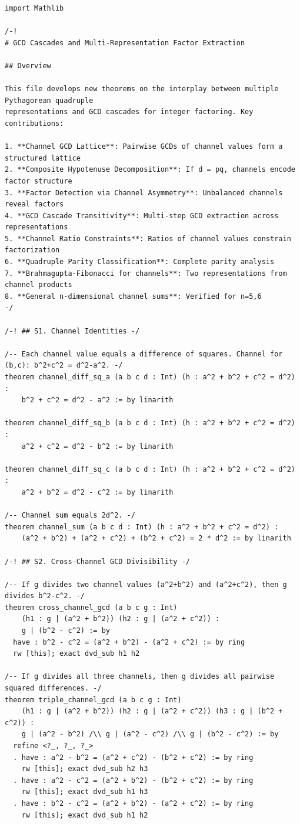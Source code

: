 \documentclass[11pt,openright,twoside]{book}
\theoremstyle{definition}
\begin{document}
\begin{lstlisting}[style=lean]
import Mathlib

/-!
# GCD Cascades and Multi-Representation Factor Extraction

## Overview

This file develops new theorems on the interplay between multiple Pythagorean quadruple
representations and GCD cascades for integer factoring. Key contributions:

1. **Channel GCD Lattice**: Pairwise GCDs of channel values form a structured lattice
2. **Composite Hypotenuse Decomposition**: If d = pq, channels encode factor structure
3. **Factor Detection via Channel Asymmetry**: Unbalanced channels reveal factors
4. **GCD Cascade Transitivity**: Multi-step GCD extraction across representations
5. **Channel Ratio Constraints**: Ratios of channel values constrain factorization
6. **Quadruple Parity Classification**: Complete parity analysis
7. **Brahmagupta-Fibonacci for channels**: Two representations from channel products
8. **General n-dimensional channel sums**: Verified for n=5,6
-/

/-! ## S1. Channel Identities -/

/-- Each channel value equals a difference of squares. Channel for (b,c): b^2+c^2 = d^2-a^2. -/
theorem channel_diff_sq_a (a b c d : Int) (h : a^2 + b^2 + c^2 = d^2) :
    b^2 + c^2 = d^2 - a^2 := by linarith

theorem channel_diff_sq_b (a b c d : Int) (h : a^2 + b^2 + c^2 = d^2) :
    a^2 + c^2 = d^2 - b^2 := by linarith

theorem channel_diff_sq_c (a b c d : Int) (h : a^2 + b^2 + c^2 = d^2) :
    a^2 + b^2 = d^2 - c^2 := by linarith

/-- Channel sum equals 2d^2. -/
theorem channel_sum (a b c d : Int) (h : a^2 + b^2 + c^2 = d^2) :
    (a^2 + b^2) + (a^2 + c^2) + (b^2 + c^2) = 2 * d^2 := by linarith

/-! ## S2. Cross-Channel GCD Divisibility -/

/-- If g divides two channel values (a^2+b^2) and (a^2+c^2), then g divides b^2-c^2. -/
theorem cross_channel_gcd (a b c g : Int)
    (h1 : g | (a^2 + b^2)) (h2 : g | (a^2 + c^2)) :
    g | (b^2 - c^2) := by
  have : b^2 - c^2 = (a^2 + b^2) - (a^2 + c^2) := by ring
  rw [this]; exact dvd_sub h1 h2

/-- If g divides all three channels, then g divides all pairwise squared differences. -/
theorem triple_channel_gcd (a b c g : Int)
    (h1 : g | (a^2 + b^2)) (h2 : g | (a^2 + c^2)) (h3 : g | (b^2 + c^2)) :
    g | (a^2 - b^2) /\\ g | (a^2 - c^2) /\\ g | (b^2 - c^2) := by
  refine <?_, ?_, ?_>
  . have : a^2 - b^2 = (a^2 + c^2) - (b^2 + c^2) := by ring
    rw [this]; exact dvd_sub h2 h3
  . have : a^2 - c^2 = (a^2 + b^2) - (b^2 + c^2) := by ring
    rw [this]; exact dvd_sub h1 h3
  . have : b^2 - c^2 = (a^2 + b^2) - (a^2 + c^2) := by ring
    rw [this]; exact dvd_sub h1 h2


\end{lstlisting}
\end{document}
